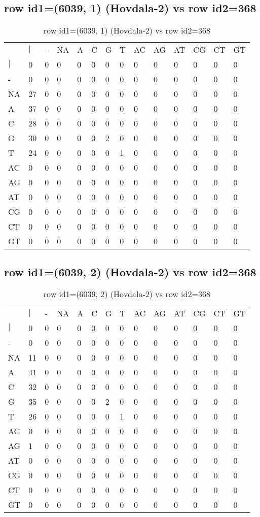 \subsection{row id1=(6039, 1) (Hovdala-2) vs row id2=368}
\begin{center}
\begin{longtable}{|l|l|l|l|l|l|l|l|l|l|l|l|l|l|}
\caption{row id1=(6039, 1) (Hovdala-2) vs row id2=368} \label{table_dm22}\\
\hline
\\
\hline
&$|$&-&NA&A&C&G&T&AC&AG&AT&CG&CT&GT\\
$|$&0&0&0&0&0&0&0&0&0&0&0&0&0\\
-&0&0&0&0&0&0&0&0&0&0&0&0&0\\
NA&27&0&0&0&0&0&0&0&0&0&0&0&0\\
A&37&0&0&0&0&0&0&0&0&0&0&0&0\\
C&28&0&0&0&0&0&0&0&0&0&0&0&0\\
G&30&0&0&0&0&2&0&0&0&0&0&0&0\\
T&24&0&0&0&0&0&1&0&0&0&0&0&0\\
AC&0&0&0&0&0&0&0&0&0&0&0&0&0\\
AG&0&0&0&0&0&0&0&0&0&0&0&0&0\\
AT&0&0&0&0&0&0&0&0&0&0&0&0&0\\
CG&0&0&0&0&0&0&0&0&0&0&0&0&0\\
CT&0&0&0&0&0&0&0&0&0&0&0&0&0\\
GT&0&0&0&0&0&0&0&0&0&0&0&0&0\\
\hline
\end{longtable}
\end{center}

\subsection{row id1=(6039, 2) (Hovdala-2) vs row id2=368}
\begin{center}
\begin{longtable}{|l|l|l|l|l|l|l|l|l|l|l|l|l|l|}
\caption{row id1=(6039, 2) (Hovdala-2) vs row id2=368} \label{table_dm24}\\
\hline
\\
\hline
&$|$&-&NA&A&C&G&T&AC&AG&AT&CG&CT&GT\\
$|$&0&0&0&0&0&0&0&0&0&0&0&0&0\\
-&0&0&0&0&0&0&0&0&0&0&0&0&0\\
NA&11&0&0&0&0&0&0&0&0&0&0&0&0\\
A&41&0&0&0&0&0&0&0&0&0&0&0&0\\
C&32&0&0&0&0&0&0&0&0&0&0&0&0\\
G&35&0&0&0&0&2&0&0&0&0&0&0&0\\
T&26&0&0&0&0&0&1&0&0&0&0&0&0\\
AC&0&0&0&0&0&0&0&0&0&0&0&0&0\\
AG&1&0&0&0&0&0&0&0&0&0&0&0&0\\
AT&0&0&0&0&0&0&0&0&0&0&0&0&0\\
CG&0&0&0&0&0&0&0&0&0&0&0&0&0\\
CT&0&0&0&0&0&0&0&0&0&0&0&0&0\\
GT&0&0&0&0&0&0&0&0&0&0&0&0&0\\
\hline
\end{longtable}
\end{center}

